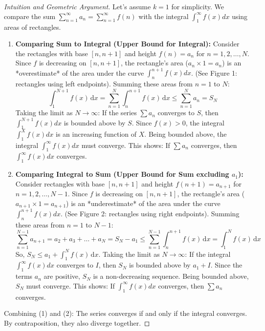 \documentclass[11pt, letterpaper]{article}
\theoremstyle{plain} %
\theoremstyle{definition} %
\theoremstyle{remark} %
\newcommand{\dx}{\,\mathrm{d}x} %
\begin{document}
\begin{proof}[Intuition and Geometric Argument]
Let's assume $k=1$ for simplicity. We compare the sum $\sum_{n=1}^\infty a_n = \sum_{n=1}^\infty f(n)$ with the integral $\int_1^\infty f(x) dx$ using areas of rectangles.

\begin{enumerate}
    \item \textbf{Comparing Sum to Integral (Upper Bound for Integral):}
    Consider the rectangles with base $[n, n+1]$ and height $f(n) = a_n$ for $n=1, 2, \dots, N$. Since $f$ is decreasing on $[n, n+1]$, the rectangle's area ($a_n \times 1 = a_n$) is an *overestimate* of the area under the curve $\int_n^{n+1} f(x) dx$. (See Figure 1: rectangles using left endpoints).
    Summing these areas from $n=1$ to $N$:
    \[ \int_1^{N+1} f(x) \dx = \sum_{n=1}^N \int_n^{n+1} f(x) \dx \le \sum_{n=1}^N a_n = S_N \]
    Taking the limit as $N \to \infty$: If the series $\sum a_n$ converges to $S$, then $\int_1^{N+1} f(x) dx$ is bounded above by $S$. Since $f(x)>0$, the integral $\int_1^X f(x) dx$ is an increasing function of $X$. Being bounded above, the integral $\int_1^\infty f(x) dx$ must converge.
    This shows: If $\sum a_n$ converges, then $\int_1^\infty f(x) dx$ converges.

    \item \textbf{Comparing Integral to Sum (Upper Bound for Sum excluding $a_1$):}
    Consider rectangles with base $[n, n+1]$ and height $f(n+1) = a_{n+1}$ for $n=1, 2, \dots, N-1$. Since $f$ is decreasing on $[n, n+1]$, the rectangle's area ($a_{n+1} \times 1 = a_{n+1}$) is an *underestimate* of the area under the curve $\int_n^{n+1} f(x) dx$. (See Figure 2: rectangles using right endpoints).
    Summing these areas from $n=1$ to $N-1$:
    \[ \sum_{n=1}^{N-1} a_{n+1} = a_2 + a_3 + \dots + a_N = S_N - a_1 \le \sum_{n=1}^{N-1} \int_n^{n+1} f(x) \dx = \int_1^N f(x) \dx \]
    So, $S_N \le a_1 + \int_1^N f(x) \dx$.
    Taking the limit as $N \to \infty$: If the integral $\int_1^\infty f(x) dx$ converges to $I$, then $S_N$ is bounded above by $a_1 + I$. Since the terms $a_n$ are positive, $S_N$ is a non-decreasing sequence. Being bounded above, $S_N$ must converge.
    This shows: If $\int_1^\infty f(x) dx$ converges, then $\sum a_n$ converges.
\end{enumerate}
Combining (1) and (2): The series converges if and only if the integral converges. By contraposition, they also diverge together.
\end{proof}
\end{document}
